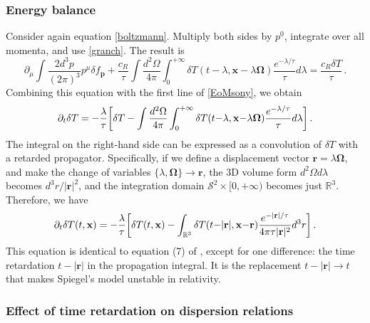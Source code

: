 \documentclass[a4paper, amsfonts, amssymb, amsmath, reprint, showkeys, nofootinbib, twoside,notitlepage,onecolumn]{revtex4-2}
\theoremstyle{definition}
\theoremstyle{theorem}
\theoremstyle{corollary}
\begin{document}
\vspace{-0.2cm}
\subsubsection{Energy balance}
\vspace{-0.2cm}

Consider again equation \eqref{boltzmann}. Multiply both sides by $p^0$, integrate over all momenta, and use \eqref{granch}. The result is
\begin{equation}
\partial_\mu \int \dfrac{2d^3 p}{(2\pi)^3}p^\mu  \delta f_\mathbf{p} +\dfrac{c_R}{\tau} \int \dfrac{d^2 \Omega}{4\pi} \int_0^{+\infty} \delta T(t{-}\lambda,\mathbf{x}{-}\lambda\mathbf{\Omega}) \dfrac{e^{-\lambda/\tau}}{\tau} d\lambda=\dfrac{c_R \delta T}{\tau} \, .
\end{equation}
Combining this equation with the first line of \eqref{EoMsony}, we obtain
\begin{equation}
 \partial_t \delta T =-\dfrac{\lambda}{\tau} \bigg[\delta T - \int \dfrac{d^2 \Omega}{4\pi} \int_0^{+\infty} \delta T(t{-}\lambda,\mathbf{x}{-}\lambda\mathbf{\Omega}) \dfrac{e^{-\lambda/\tau}}{\tau} d\lambda  \bigg]  \, . \\
\end{equation}
The integral on the right-hand side can be expressed as a convolution of $\delta T$ with a retarded propagator. Specifically, if we define a displacement vector $\mathbf{r}=\lambda \mathbf{\Omega}$, and make the change of variables $\{\lambda,\mathbf{\Omega} \}\rightarrow \mathbf{r}$, the 3D volume form $d^2\Omega d\lambda$ becomes $d^3 r/|\mathbf{r}|^2$, and the integration domain $\mathcal{S}^2 \times [0,+\infty)$ becomes just $\mathbb{R}^3$. Therefore, we have
\begin{equation}\label{Ccinque}
 \partial_t \delta T(t,\mathbf{x}) =-\dfrac{\lambda}{\tau} \bigg[\delta T(t,\mathbf{x}) - \int_{\mathbb{R}^3}  \delta T(t{-}|\mathbf{r}|,\mathbf{x}{-}\mathbf{r}) \dfrac{e^{-|\mathbf{r}|/\tau}}{4\pi \tau |\mathbf{r}|^2} d^3 r  \bigg]  \, . \\
\end{equation}
This equation is identical to equation (7) of \citet{Spiegel1957}, except for one difference: the time retardation $t-|\mathbf{r}|$ in the propagation integral. It is the replacement $t-|\mathbf{r}|\rightarrow t$ that makes Spiegel's model unstable in relativity.

\vspace{-0.2cm}
\subsubsection{Effect of time retardation on dispersion relations}
\vspace{-0.2cm}
\end{document}
